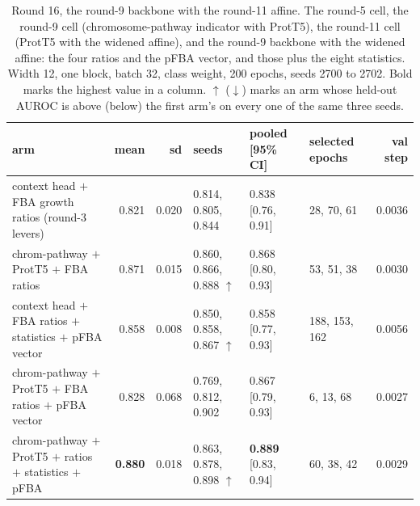 \begin{table}[H]
  \centering
  \footnotesize
  \setlength{\tabcolsep}{2.5pt}
  \caption[Round 16, the round-9 backbone with the round-11 affine]{Round 16, the round-9 backbone with the round-11 affine. The round-5 cell, the round-9 cell (chromosome-pathway indicator with ProtT5), the round-11 cell (ProtT5 with the widened affine), and the round-9 backbone with the widened affine: the four ratios and the pFBA vector, and those plus the eight statistics. Width 12, one block, batch 32, class weight, 200 epochs, seeds 2700 to 2702. Bold marks the highest value in a column. $\uparrow$ ($\downarrow$) marks an arm whose held-out AUROC is above (below) the first arm's on every one of the same three seeds.}
  \label{tab:w27}
  \begin{tabular}{@{}lrrlllr@{}}
    \hline
    arm & mean & sd & seeds & pooled [95\% CI] & selected epochs & val step \\
    \hline
    context head $+$ FBA growth ratios (round-3 levers) & 0.821 & 0.020 & 0.814, 0.805, 0.844 & 0.838 [0.76, 0.91] & 28, 70, 61 & 0.0036 \\
    chrom-pathway $+$ ProtT5 $+$ FBA ratios & 0.871 & 0.015 & 0.860, 0.866, 0.888 $\uparrow$ & 0.868 [0.80, 0.93] & 53, 51, 38 & 0.0030 \\
    context head $+$ FBA ratios $+$ statistics $+$ pFBA vector & 0.858 & 0.008 & 0.850, 0.858, 0.867 $\uparrow$ & 0.858 [0.77, 0.93] & 188, 153, 162 & 0.0056 \\
    chrom-pathway $+$ ProtT5 $+$ FBA ratios $+$ pFBA vector & 0.828 & 0.068 & 0.769, 0.812, 0.902 & 0.867 [0.79, 0.93] & 6, 13, 68 & 0.0027 \\
    chrom-pathway $+$ ProtT5 $+$ ratios $+$ statistics $+$ pFBA & \textbf{0.880} & 0.018 & 0.863, 0.878, 0.898 $\uparrow$ & \textbf{0.889} [0.83, 0.94] & 60, 38, 42 & 0.0029 \\
    \hline
  \end{tabular}
\end{table}
